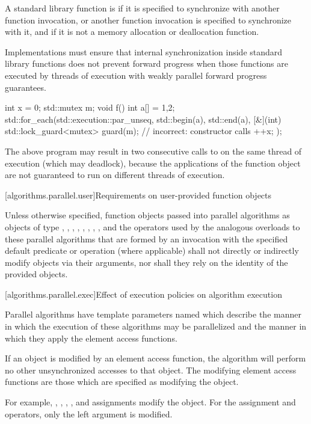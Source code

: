 \pnum
A standard library function is 
if it is specified to synchronize with another function invocation, or
another function invocation is specified to synchronize with it,
and if it is not a memory allocation or deallocation function.
\begin{note}
Implementations must ensure that internal synchronization
inside standard library functions does not prevent forward progress
when those functions are executed by threads of execution
with weakly parallel forward progress guarantees.
\end{note}
\begin{example}
\begin{codeblock}
int x = 0;
std::mutex m;
void f() {
  int a[] = {1,2};
  std::for_each(std::execution::par_unseq, std::begin(a), std::end(a), [&](int) {
    std::lock_guard<mutex> guard(m);            // incorrect:  constructor calls 
    ++x;
  });
}
\end{codeblock}
The above program may result in two consecutive calls to 
on the same thread of execution (which may deadlock),
because the applications of the function object are not guaranteed
to run on different threads of execution.
\end{example}

[algorithms.parallel.user]{Requirements on user-provided function objects}

\pnum
Unless otherwise specified,
function objects passed into parallel algorithms as objects of type
,
,
,
,
,
,
,
, and
the operators used by the analogous overloads to these parallel algorithms
that are formed by an invocation
with the specified default predicate or operation (where applicable)
shall not directly or indirectly modify objects via their arguments,
nor shall they rely on the identity of the provided objects.

[algorithms.parallel.exec]{Effect of execution policies on algorithm execution}

\pnum
Parallel algorithms have
template parameters named 
which describe the manner in which the execution of these algorithms may be
parallelized and the manner in which they apply the element access functions.

\pnum
If an object is modified by an element access function,
the algorithm will perform no other unsynchronized accesses to that object.
The modifying element access functions are those
which are specified as modifying the object.
\begin{note}
For example,
,
\tcode{++},
\tcode{--},
, and
assignments
modify the object.
For the assignment and  operators, only the left argument is modified.
\end{note}

